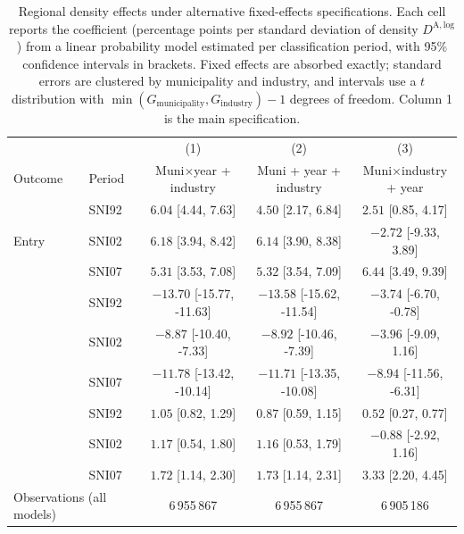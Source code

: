\begin{table}[htbp]
\centering
\small
\caption{Regional density effects under alternative fixed-effects specifications. Each cell reports the coefficient (percentage points per standard deviation of density $D^{\mathrm{A,log}}$) from a linear probability model estimated per classification period, with 95\% confidence intervals in brackets. Fixed effects are absorbed exactly; standard errors are clustered by municipality and industry, and intervals use a $t$ distribution with $\min(G_{\text{municipality}}, G_{\text{industry}})-1$ degrees of freedom. Column 1 is the main specification.}
\label{tab:fe_robustness}
\begin{tabular}{llccc}
\toprule
 & & (1) & (2) & (3) \\
Outcome & Period & Muni$\times$year + industry & Muni + year + industry & Muni$\times$industry + year \\
\midrule
\multirow{3}{*}{Entry} & SNI92 & $\mathbf{6.04}$ [4.44, 7.63] & $4.50$ [2.17, 6.84] & $2.51$ [0.85, 4.17] \\
 & SNI02 & $\mathbf{6.18}$ [3.94, 8.42] & $6.14$ [3.90, 8.38] & $-2.72$ [-9.33, 3.89] \\
 & SNI07 & $\mathbf{5.31}$ [3.53, 7.08] & $5.32$ [3.54, 7.09] & $6.44$ [3.49, 9.39] \\
\addlinespace
\multirow{3}{*}{Exit} & SNI92 & $\mathbf{-13.70}$ [-15.77, -11.63] & $-13.58$ [-15.62, -11.54] & $-3.74$ [-6.70, -0.78] \\
 & SNI02 & $\mathbf{-8.87}$ [-10.40, -7.33] & $-8.92$ [-10.46, -7.39] & $-3.96$ [-9.09, 1.16] \\
 & SNI07 & $\mathbf{-11.78}$ [-13.42, -10.14] & $-11.71$ [-13.35, -10.08] & $-8.94$ [-11.56, -6.31] \\
\addlinespace
\multirow{3}{*}{Startup formation} & SNI92 & $\mathbf{1.05}$ [0.82, 1.29] & $0.87$ [0.59, 1.15] & $0.52$ [0.27, 0.77] \\
 & SNI02 & $\mathbf{1.17}$ [0.54, 1.80] & $1.16$ [0.53, 1.79] & $-0.88$ [-2.92, 1.16] \\
 & SNI07 & $\mathbf{1.72}$ [1.14, 2.30] & $1.73$ [1.14, 2.31] & $3.33$ [2.20, 4.45] \\
\midrule
\multicolumn{2}{l}{Observations (all models)} & 6\,955\,867 & 6\,955\,867 & 6\,905\,186 \\
\bottomrule
\end{tabular}
\end{table}
